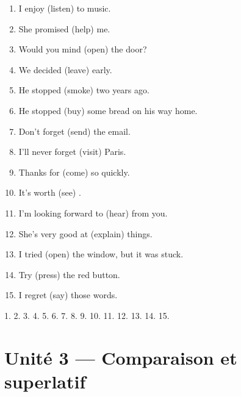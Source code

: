 \begin{exo}[2.1 --- \en{-ing} ou \en{to} ?]
\begin{enumerate}
  \item I enjoy (listen) \trou[2cm] to music.
  \item She promised (help) \trou[2cm] me.
  \item Would you mind (open) \trou[2.5cm] the door?
  \item We decided (leave) \trou[2cm] early.
  \item He stopped (smoke) \trou[2cm] two years ago.
  \item He stopped (buy) \trou[2cm] some bread on his way home.
  \item Don't forget (send) \trou[2.5cm] the email.
  \item I'll never forget (visit) \trou[2cm] Paris.
  \item Thanks for (come) \trou[2cm] so quickly.
  \item It's worth (see) \trou[2cm].
  \item I'm looking forward to (hear) \trou[2cm] from you.
  \item She's very good at (explain) \trou[2cm] things.
  \item I tried (open) \trou[2cm] the window, but it was stuck.
  \item Try (press) \trou[2.5cm] the red button.
  \item I regret (say) \trou[2cm] those words.
\end{enumerate}
\end{exo}
\begin{corrige}[2.1]
1.  2.  3.  4.  5. 
6.  7.  8.  9.  10. 
11.  12.  13.  14. 
15. 
\end{corrige}

\section{Unité 3 --- Comparaison et superlatif}

